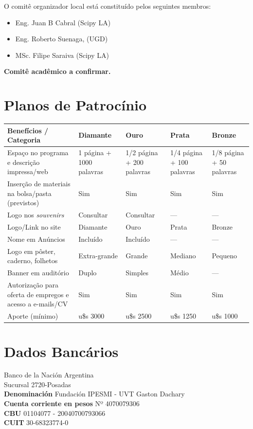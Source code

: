 \documentclass[11pt,a4paper]{report}
\begin{document}
O comitê organizador local está constituído pelos seguintes membros:\\

\begin{itemize}[nolistsep]
    \item Eng. Juan B Cabral (Scipy LA)
    \item Eng. Roberto Suenaga, (UGD)
    \item MSc. Filipe Saraiva (Scipy LA)
\end{itemize}

\textbf{Comitê acadêmico a confirmar.}

\section*{Planos de Patrocínio}
\begin{center}

\begin{tabular}{|p{4cm}|p{2.5cm}|p{2.5cm}|p{2.5cm}|p{2.5cm}|}
\hline
Benefícios / Categoria & Diamante & Ouro  & Prata & Bronze \\
\hline
Espaço no programa e descrição impressa/web & 1 página +
1000 palavras & 1/2 página + 200 palavras & 1/4 página + 100 palavras &  1/8 página + 50 palavras\\
\hline
Inserção de materiais na bolsa/pasta (previstos) & Sim & Sim & Sim & Sim \\
\hline
Logo nos \textit{souvenirs} & Consultar & Consultar & --- & --- \\
\hline
Logo/Link no site & Diamante & Ouro & Prata & Bronze \\
\hline
Nome em Anúncios & Incluído & Incluído & --- & --- \\
\hline
Logo em pôster, caderno, folhetos & Extra-grande & Grande & Mediano & Pequeno \\
\hline
Banner em auditório & Duplo & Simples & Médio & --- \\
\hline
Autorização para oferta de empregos e acesso a e-mails/CV & Sim & Sim & Sim & Sim \\
\hline
Aporte (mínimo) & u\$s 3000 & u\$s 2500 & u\$s 1250 & u\$s 1000\\
\hline
\end{tabular}
\end{center}

\section*{Dados Bancários}
\noindent Banco de la Nación Argentina \\
Sucursal 2720-Posadas \\
\textbf{Denominación} Fundación IPESMI - UVT Gaston Dachary \\
\textbf{Cuenta corriente en pesos} Nº 4070079306 \\
\textbf{CBU} 01104077 - 20040700793066 \\
\textbf{CUIT} 30-68323774-0 \\
\end{document}
